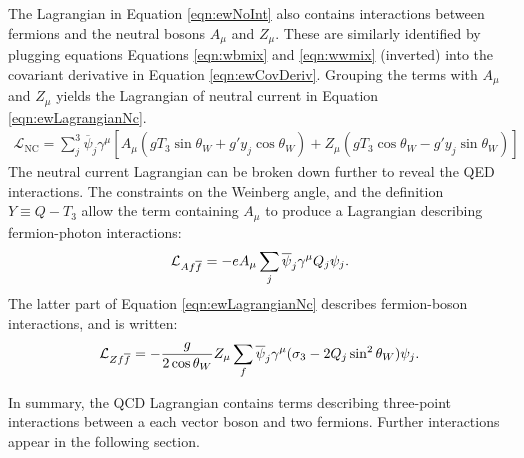 The Lagrangian in Equation \ref{eqn:ewNoInt} also contains interactions between fermions and the neutral bosons $A_\mu$ and $Z_\mu$.
These are similarly identified by plugging equations Equations \ref{eqn:wbmix} and \ref{eqn:wwmix} (inverted) into the covariant derivative in Equation \ref{eqn:ewCovDeriv}.
Grouping the terms with $A_\mu$ and $Z_\mu$ yields the Lagrangian of neutral current in Equation \ref{eqn:ewLagrangianNc}.
\begin{equation}\begin{split}\label{eqn:ewLagrangianNc}
    \mathcal{L}_\text{NC} = \sum_j^3 \overline{\psi}_j\gamma^\mu\left[A_\mu(gT_3\sin\theta_W+g'y_j\cos\theta_W)+Z_\mu(gT_3\cos\theta_W-g'y_j\sin\theta_W)\right]
\end{split}\end{equation}
The neutral current Lagrangian can be broken down further to reveal the QED interactions.
The constraints on the Weinberg angle, and the definition $Y\equiv Q-T_3$ allow the term containing $A_\mu$ to produce a Lagrangian describing fermion-photon interactions:
\begin{equation}\begin{split}
    \mathcal{L}_{Af\overline{f}}=-eA_\mu\sum_j\overline{\psi}_j\gamma^\mu Q_j\psi_j.
\end{split}\end{equation}
The latter part of Equation \ref{eqn:ewLagrangianNc} describes fermion-\Z boson interactions, and is written:
\begin{equation}\begin{split}
    \mathcal{L}_{Zf\overline{f}} = -\frac{g}{2\cos\theta_W}Z_\mu\sum_f\overline{\psi}_j\gamma^\mu(\sigma_3-2Q_j\sin^2\theta_W)\psi_j.
\end{split}\end{equation}

In summary, the QCD Lagrangian contains terms describing three-point interactions between a each vector boson and two fermions.
Further interactions appear in the following section.


